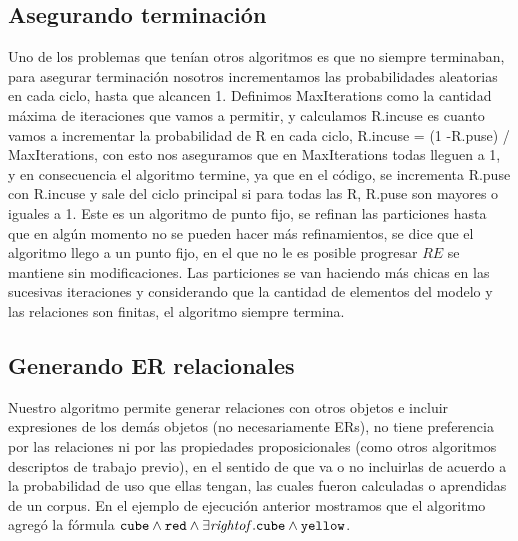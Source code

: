 



\subsection{Asegurando terminaci\'on}

Uno de los problemas que ten\'ian otros algoritmos es que no siempre terminaban, para asegurar terminaci\'on nosotros incrementamos las probabilidades aleatorias en cada ciclo, hasta que alcancen 1. Definimos MaxIterations como la cantidad m\'axima de iteraciones que vamos a permitir, y calculamos R.incuse es cuanto vamos a incrementar la probabilidad de R en cada ciclo, R.incuse = (1 -R.puse) / MaxIterations, con esto nos aseguramos que en MaxIterations todas lleguen a 1, y en consecuencia el algoritmo termine, ya que en el c\'odigo, se incrementa R.puse con R.incuse y sale del ciclo principal si para todas las R, R.puse son mayores o iguales a 1.
Este es un algoritmo de punto fijo, se refinan las particiones hasta que en alg\'un momento no se pueden hacer m\'as refinamientos, se dice que el algoritmo llego a un punto fijo, en el que no le es posible progresar $RE$ se mantiene sin modificaciones. Las particiones se van haciendo m\'as chicas en las sucesivas iteraciones y considerando que la cantidad de elementos del modelo y las relaciones son finitas, el algoritmo siempre termina.

\subsection{Generando ER relacionales}

Nuestro algoritmo permite generar relaciones con otros objetos e incluir expresiones de los dem\'as objetos (no necesariamente ERs), no tiene preferencia por las relaciones ni por las propiedades proposicionales (como otros algoritmos descriptos de trabajo previo), en el sentido de que va o no incluirlas de acuerdo a la probabilidad de uso que ellas tengan, las cuales fueron calculadas o aprendidas de un corpus. En el ejemplo de ejecuci\'on anterior mostramos que el algoritmo agreg\'o la f\'ormula $\texttt{cube} \wedge \texttt{red} \wedge \exists \mathit{rightof}. \texttt{cube} \wedge \texttt{yellow}$.

